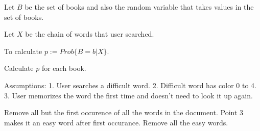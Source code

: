 \documentclass{pracjourn}
\begin{document}
 


Let $B$ be the set of books and also the random variable that takes values in the set of books.

Let $X$ be the chain of words that user searched. 

To calculate $p := Prob\{ B = b | X \}$. 

Calculate $p$ for each book. 

Assumptions:
    1. User searches a difficult word.
    2. Difficult word has color 0 to 4.
    3. User memorizes the word the first time and doesn't need to look it up again. 

Remove all but the first occurence of all the words in the document. Point 3 makes it an easy word after first occurance. 
Remove all the easy words. %
\end{document}
